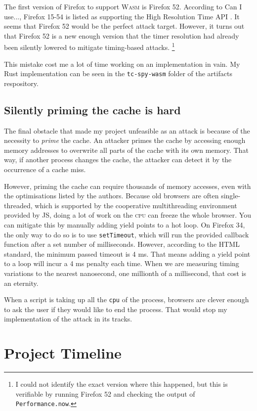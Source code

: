 \documentclass[a4paper,10pt,twocolumn]{article}
\theoremstyle{definition}
\newcommand*{\code}{\texttt}
\newcommand*{\acronym}{\textsc}
\newcommand*{\WASM}{\acronym{Wasm}}
\begin{document}
The first version of Firefox to support \WASM{} is Firefox 52.
According to Can I use..., Firefox 15-54 is listed as supporting the High
Resolution Time API \parencite{caniuse}.
It seems that Firefox 52 would be the perfect attack target.
However, it turns out that Firefox 52 is a new enough version that the timer
resolution had already been silently lowered to mitigate timing-based attacks.
\footnote{I could not identify the exact version where this happened, but this
is verifiable by running Firefox 52 and checking the output of
\code{Performance.now}.}

This mistake cost me a lot of time working on an implementation in vain.
My Rust implementation can be seen in the \code{tc-spy-wasm} folder of the
artifacts respository.

\subsection{Silently priming the cache is hard}

The final obstacle that made my project unfeasible as an attack is because of
the necessity to \emph{prime} the cache.
An attacker primes the cache by accessing enough memory addresses to overwrite all parts
of the cache with its own memory.
That way, if another process changes the cache, the attacker can detect it by
the occurrence of a cache miss.

However, priming the cache can require thousands of memory accesses, even with
the optimisations listed by the authors.
Because old browsers are often single-threaded, which is supported by the
cooperative multithreading environment provided by JS, doing a lot of work on
the \acronym{cpu} can freeze the whole browser.
You can mitigate this by manually adding yield points to a hot loop.
On Firefox 34, the only way to do so is to use \code{setTimeout}, which will run
the provided callback function after a set number of milliseconds.
However, according to the HTML standard, the minimum passed timeout is 4 ms.
That means adding a yield point to a loop will incur a 4 ms penalty each time.
When we are measuring timing variations to the nearest nanosecond, one millionth
of a millisecond, that cost is an eternity.

When a script is taking up all the \code{cpu} of the process, browsers are
clever enough to ask the user if they would like to end the process.
That would stop my implementation of the attack in its tracks.

\appendix
\section{Project Timeline}
\end{document}
